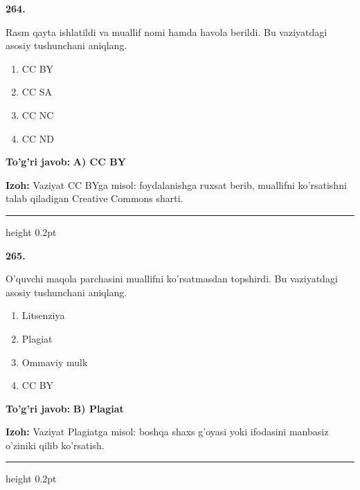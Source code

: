 \documentclass[10pt,a4paper,oneside]{article}
\begin{document}
\noindent\textbf{\color{ink}264.}
\par
Rasm qayta ishlatildi va muallif nomi hamda havola berildi. Bu vaziyatdagi asosiy tushunchani aniqlang.
\begin{enumerate}[label=\Alph*),leftmargin=9mm]
\item CC BY
\item CC SA
\item CC NC
\item CC ND
\end{enumerate}
\begin{tcolorbox}[enhanced,breakable,colback=teal!4,colframe=teal!50!black,boxrule=0.5pt,arc=1.1mm,left=3mm,right=3mm,top=1.7mm,bottom=1.7mm,before skip=2mm,after skip=2mm]
\textbf{\color{teal}To'g'ri javob:} \textbf{A) CC BY}
\par\smallskip
\textbf{Izoh:} Vaziyat CC BYga misol: foydalanishga ruxsat berib, muallifni ko'rsatishni talab qiladigan Creative Commons sharti.
\end{tcolorbox}
\vspace{2mm}\hrule height 0.2pt \vspace{3mm}

\noindent\textbf{\color{ink}265.}
\par
O'quvchi maqola parchasini muallifni ko'rsatmasdan topshirdi. Bu vaziyatdagi asosiy tushunchani aniqlang.
\begin{enumerate}[label=\Alph*),leftmargin=9mm]
\item Litsenziya
\item Plagiat
\item Ommaviy mulk
\item CC BY
\end{enumerate}
\begin{tcolorbox}[enhanced,breakable,colback=teal!4,colframe=teal!50!black,boxrule=0.5pt,arc=1.1mm,left=3mm,right=3mm,top=1.7mm,bottom=1.7mm,before skip=2mm,after skip=2mm]
\textbf{\color{teal}To'g'ri javob:} \textbf{B) Plagiat}
\par\smallskip
\textbf{Izoh:} Vaziyat Plagiatga misol: boshqa shaxs g'oyasi yoki ifodasini manbasiz o'ziniki qilib ko'rsatish.
\end{tcolorbox}
\vspace{2mm}\hrule height 0.2pt \vspace{3mm}
\end{document}

